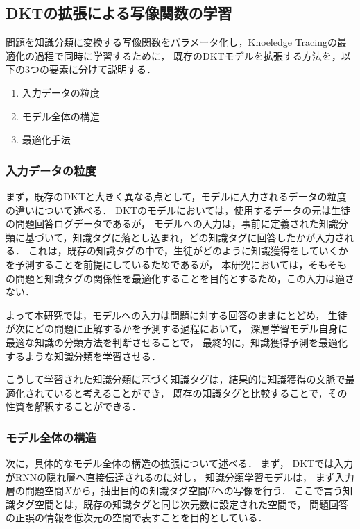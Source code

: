 \subsection{DKTの拡張による写像関数の学習}
\label{sec:tag_learn}

問題を知識分類に変換する写像関数をパラメータ化し，Knoeledge Tracingの最適化の過程で同時に学習するために，
既存のDKTモデルを拡張する方法を，以下の3つの要素に分けて説明する．

\begin{enumerate}
	\item 入力データの粒度
	\item モデル全体の構造
	\item 最適化手法
\end{enumerate}


\subsubsection{入力データの粒度}
まず，既存のDKTと大きく異なる点として，モデルに入力されるデータの粒度の違いについて述べる．
DKTのモデルにおいては，使用するデータの元は生徒の問題回答ログデータであるが，
モデルへの入力は，事前に定義された知識分類に基づいて，知識タグに落とし込まれ，どの知識タグに回答したかが入力される．
これは，既存の知識タグの中で，生徒がどのように知識獲得をしていくかを予測することを前提にしているためであるが，
本研究においては，そもそもの問題と知識タグの関係性を最適化することを目的とするため，この入力は適さない．

よって本研究では，モデルへの入力は問題に対する回答のままにとどめ，
生徒が次にどの問題に正解するかを予測する過程において，
深層学習モデル自身に最適な知識の分類方法を判断させることで，
最終的に，知識獲得予測を最適化するような知識分類を学習させる．

こうして学習された知識分類に基づく知識タグは，結果的に知識獲得の文脈で最適化されていると考えることができ，
既存の知識タグと比較することで，その性質を解釈することができる．


\subsubsection{モデル全体の構造}
次に，具体的なモデル全体の構造の拡張について述べる．
まず，
DKTでは入力がRNNの隠れ層へ直接伝達されるのに対し，
知識分類学習モデルは，
まず入力層の問題空間$X$から，抽出目的の知識タグ空間$U$への写像を行う．
ここで言う知識タグ空間とは，既存の知識タグと同じ次元数に設定された空間で，
問題回答の正誤の情報を低次元の空間で表すことを目的としている．

